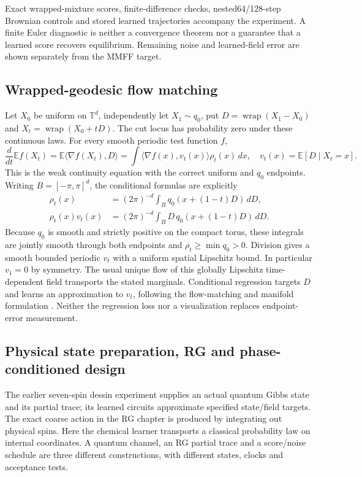 Exact wrapped-mixture scores, finite-difference checks, nested64/128-step
Brownian controls and stored learned trajectories accompany the experiment.
A finite Euler diagnostic is neither a convergence theorem nor a guarantee
that a learned score recovers equilibrium. Remaining noise and learned-field
error are shown separately from the MMFF target.

\subsection{Wrapped-geodesic flow matching}
Let $X_0$ be uniform on $\mathbb T^d$, independently let $X_1\sim q_0$, put
$D=\operatorname{wrap}(X_1-X_0)$ and
$X_t=\operatorname{wrap}(X_0+tD)$. The cut locus has probability zero under
these continuous laws. For every smooth periodic test function $f$,
\[
 \frac d{dt}\mathbb Ef(X_t)
 =\mathbb E\langle\nabla f(X_t),D\rangle
 =\int\langle\nabla f(x),v_t(x)\rangle\rho_t(x)\,dx,
 \quad v_t(x)=\mathbb E[D\mid X_t=x].
\]
This is the weak continuity equation with the correct uniform and $q_0$
endpoints. Writing $B=[-\pi,\pi]^d$, the conditional formulas are explicitly
\[
 \begin{aligned}
 \rho_t(x)&=(2\pi)^{-d}\int_Bq_0(x+(1-t)D)\,dD,\\
 \rho_t(x)v_t(x)&=(2\pi)^{-d}\int_BD\,q_0(x+(1-t)D)\,dD.
 \end{aligned}
\]
Because $q_0$ is smooth and strictly positive on the compact torus,
these integrals are jointly smooth through both endpoints and
$\rho_t\ge\min q_0>0$. Division gives a smooth bounded periodic $v_t$
with a uniform spatial Lipschitz bound. In particular $v_1=0$ by symmetry. The usual unique flow of this globally Lipschitz
time-dependent field transports the stated marginals. Conditional regression
targets $D$ and learns an approximation to $v_t$, following the flow-matching
and manifold formulation \cite{VisFlow,VisRFM}. Neither the regression loss
nor a visualization replaces endpoint-error measurement.

\subsection{Physical state preparation, RG and phase-conditioned design}
The earlier seven-spin dessin experiment supplies an actual quantum Gibbs
state and its partial trace; its learned circuits approximate specified
state/field targets. The exact coarse action in the RG chapter is produced
by integrating out physical spins. Here the chemical learner transports a
classical probability law on internal coordinates. A quantum channel, an RG
partial trace and a score/noise schedule are three different constructions,
with different states, clocks and acceptance tests.

